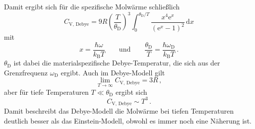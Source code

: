 Damit ergibt sich für die spezifische Molwärme schließlich
\begin{equation}
  C_\text{V, Debye} = 9R \left(\frac{T}{\theta_\text{D}}\right)^3 \int_0^{\theta_\text{D}/T} \frac{x^4\text{e}^x}{(\text{e}^x-1)^2}\,\text{d}x
\end{equation}
mit
\begin{equation*}
  x = \frac{\hbar\omega}{k_\text{B}T} \qquad \text{und} \qquad \frac{\theta_\text{D}}{T} = \frac{\hbar\omega_\text{D}}{k_\text{B}T}\,.
\end{equation*}
$\theta_\text{D}$ ist dabei die materialspezifische Debye-Temperatur, die sich aus der Grenzfrequenz $\omega_\text{D}$ ergibt. Auch im Debye-Modell gilt
\begin{equation*}
  \lim_{T\to\infty} C_\text{V, Debye} = 3R \,,
\end{equation*}
aber für tiefe Temperaturen $T\ll\theta_\text{D}$ ergibt sich
\begin{equation*}
  C_\text{V, Debye} \sim T^3\,.
\end{equation*}
Damit beschreibt das Debye-Modell die Molwärme bei tiefen Temperaturen deutlich besser als das Einstein-Modell, obwohl es immer noch eine Näherung ist.
